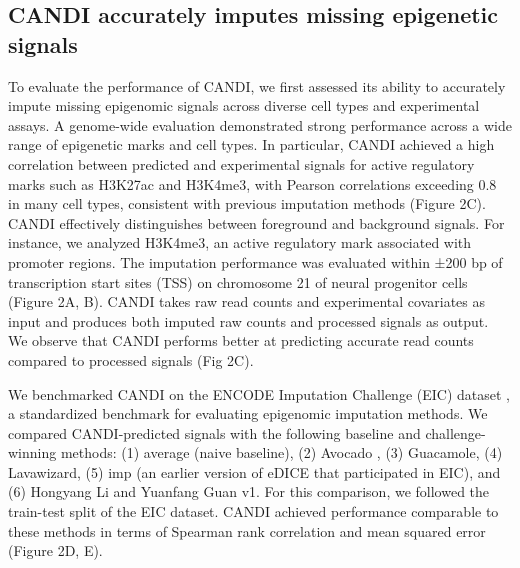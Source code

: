 \subsection{CANDI accurately imputes missing epigenetic signals}
To evaluate the performance of CANDI, we first assessed its ability to accurately impute missing epigenomic signals across diverse cell types and experimental assays. A genome-wide evaluation demonstrated strong performance across a wide range of epigenetic marks and cell types. In particular, CANDI achieved a high correlation between predicted and experimental signals for active regulatory marks such as H3K27ac and H3K4me3, with Pearson correlations exceeding 0.8 in many cell types, consistent with previous imputation methods (Figure 2C). CANDI effectively distinguishes between foreground and background signals. For instance, we analyzed H3K4me3, an active regulatory mark associated with promoter regions. The imputation performance was evaluated within ±200 bp of transcription start sites (TSS) on chromosome 21 of neural progenitor cells (Figure 2A, B). CANDI takes raw read counts and experimental covariates as input and produces both imputed raw counts and processed signals as output. We observe that CANDI performs better at predicting accurate read counts compared to processed signals (Fig 2C).

We benchmarked CANDI on the ENCODE Imputation Challenge (EIC) dataset \cite{schreiber2023encode}, a standardized benchmark for evaluating epigenomic imputation methods. We compared CANDI-predicted signals with the following baseline and challenge-winning methods: (1) average (naive baseline), (2) Avocado \cite{schreiber2020avocado}, (3) Guacamole, (4) Lavawizard, (5) imp (an earlier version of eDICE \cite{hawkins2023getting} that participated in EIC), and (6) Hongyang Li and Yuanfang Guan v1. For this comparison, we followed the train-test split of the EIC dataset. CANDI achieved performance comparable to these methods in terms of Spearman rank correlation and mean squared error (Figure 2D, E). 


